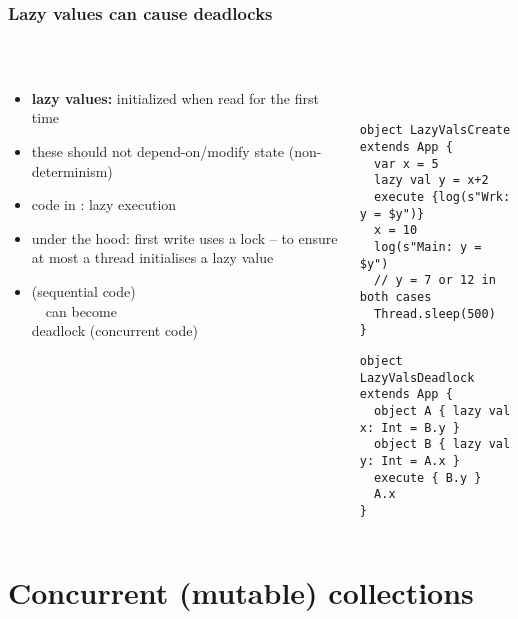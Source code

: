 \documentclass[aspectratio=169]{beamer}
\begin{document}
\begin{frame}[fragile]\frametitle{Lazy values can cause deadlocks}
~\\[-8mm]
\begin{columns}
\begin{column}{0.48\textwidth}
\begin{itemize}
  \item \alert{\textbf{lazy values:}} initialized when read for the first time
  \item these should not depend-on/modify state (non-determinism)
  \item code in : lazy execution
  \item under the hood: first write uses a lock -- to ensure at most a thread initialises a lazy value
  \item {} (sequential code)\\~~can become\\
        \alert{deadlock} (concurrent code)

\end{itemize}
\end{column}
\begin{column}{0.54\textwidth}
~\\
\begin{lstlisting}[emph={execute,sleep,log,compareAndSet,mySynchronized,AtomicBoolean}]
object LazyValsCreate extends App {
  var x = 5
  lazy val y = x+2
  execute {log(s"Wrk: y = $y")}
  x = 10
  log(s"Main: y = $y")
  // y = 7 or 12 in both cases
  Thread.sleep(500)
}
\end{lstlisting}
\begin{lstlisting}[emph={execute,sleep,log,compareAndSet,mySynchronized,AtomicBoolean}]
object LazyValsDeadlock extends App {
  object A { lazy val x: Int = B.y }
  object B { lazy val y: Int = A.x }
  execute { B.y }
  A.x
}
\end{lstlisting}
\end{column}
\end{columns}
\end{frame}



\section{Concurrent (mutable) collections} %
\end{document}

